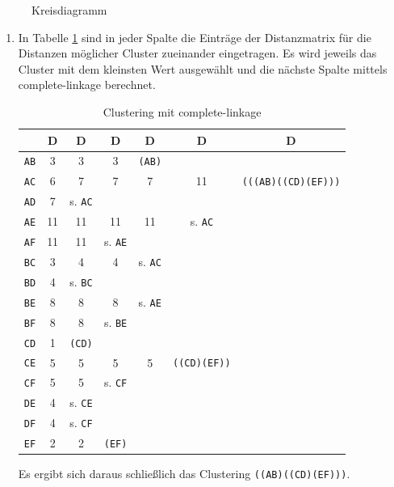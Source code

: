 \documentclass{homework}
\begin{document}
\begin{enumerate}
\begin{enumerate}
\begin{figure}
\caption{Kreisdiagramm}
\label{fig:44b}
\end{figure}

\end{enumerate}

\begin{enumerate}
\item
In Tabelle \ref{tab:45a} sind in jeder Spalte die Einträge der Distanzmatrix für die Distanzen möglicher Cluster zueinander eingetragen.
Es wird jeweils das Cluster mit dem kleinsten Wert ausgewählt und die nächste Spalte mittels complete-linkage berechnet.

\begin{table}
\begin{tabular}{|c|cccccc|}
\hline
 	& D & D & D & D & D & D \\\hline\hline
\texttt{AB}	& 3		& 3		& 3		& \texttt{(AB)}	& 		& \\
\texttt{AC}	& 6		& 7		& 7		& 7		& 11	& \texttt{(((AB)((CD)(EF)))}\\
\texttt{AD}	& 7		& s. \texttt{AC}	& 		& 		& 		& \\
\texttt{AE}	& 11	& 11	& 11	& 11	& s. \texttt{AC}	& \\
\texttt{AF}	& 11	& 11	& s. \texttt{AE}	& 		& 		& \\
\texttt{BC}	& 3		& 4		& 4		& s. \texttt{AC}	& 		& \\
\texttt{BD}	& 4		& s. \texttt{BC}	& 		& 		& 		& \\
\texttt{BE}	& 8		& 8		& 8		& s. \texttt{AE}	& 		& \\
\texttt{BF}	& 8		& 8		& s. \texttt{BE}	& 		& 		& \\
\texttt{CD}	& 1		& \texttt{(CD)}	& 		& 		& 		& \\
\texttt{CE}	& 5		& 5		& 5		& 5		& \texttt{((CD)(EF))}	& \\
\texttt{CF}	& 5		& 5		& s. \texttt{CF}	& 		& 		& \\
\texttt{DE}	& 4		& s. \texttt{CE}	& 		& 		& 		& \\
\texttt{DF}	& 4		& s. \texttt{CF}	& 		& 		& 		& \\
\texttt{EF}	& 2		& 2		& \texttt{(EF)}	& 		& 		& \\
\hline
\end{tabular}

\caption{Clustering mit complete-linkage}
\label{tab:45a}
\end{table}

Es ergibt sich daraus schließlich das Clustering \texttt{((AB)((CD)(EF)))}.


\end{enumerate}
\end{enumerate}
\end{document}
